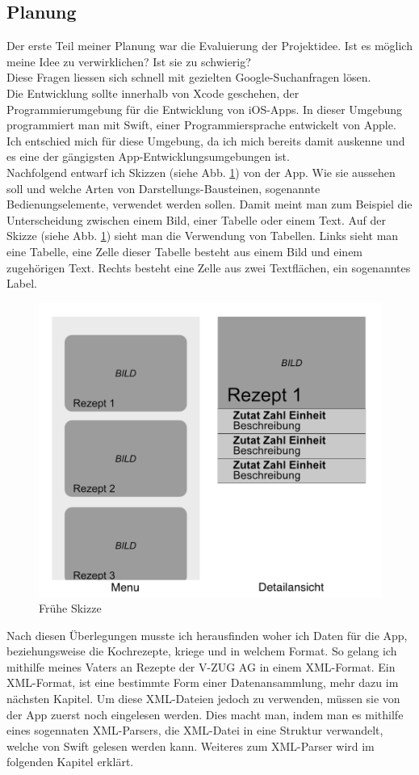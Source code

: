 \documentclass[12pt]{article}
\begin{document}
\subsection{Planung}
Der erste Teil meiner Planung war die Evaluierung der Projektidee. Ist es möglich meine Idee zu verwirklichen? Ist sie zu schwierig? \\ Diese Fragen liessen sich schnell mit gezielten Google-Suchanfragen lösen. \\ Die Entwicklung sollte innerhalb von Xcode geschehen, der Programmierumgebung für die Entwicklung von iOS-Apps. In dieser Umgebung programmiert man mit Swift, einer Programmiersprache entwickelt von Apple. Ich entschied mich für diese Umgebung, da ich mich bereits damit auskenne und es eine der gängigsten App-Entwicklungsumgebungen ist.\\ Nachfolgend entwarf ich Skizzen (siehe Abb. \ref{fig:earlySketch}) von der App. Wie sie aussehen soll und welche Arten von Darstellungs-Bausteinen, sogenannte Bedienungselemente, verwendet werden sollen. Damit meint man zum Beispiel die Unterscheidung zwischen einem Bild, einer Tabelle oder einem Text. Auf der Skizze (siehe Abb. \ref{fig:earlySketch}) sieht man die Verwendung von Tabellen. Links sieht man eine Tabelle, eine Zelle dieser Tabelle besteht aus einem Bild und einem zugehörigen Text. Rechts besteht eine Zelle aus zwei Textflächen, ein sogenanntes Label.
\begin{figure}
    \includegraphics[width=\linewidth]{pictures/Sketch.png}
    \caption{Frühe Skizze}
    \label{fig:earlySketch}
\end{figure}
Nach diesen Überlegungen musste ich herausfinden woher ich Daten für die App, beziehungsweise die Kochrezepte, kriege und in welchem Format. So gelang ich mithilfe meines Vaters an Rezepte der V-ZUG AG in einem XML-Format. Ein XML-Format, ist eine bestimmte Form einer Datenansammlung, mehr dazu im nächsten Kapitel. Um diese XML-Dateien jedoch zu verwenden, müssen sie von der App zuerst noch eingelesen werden. Dies macht man, indem man es mithilfe eines sogennaten XML-Parsers, die XML-Datei in eine Struktur verwandelt, welche von Swift gelesen werden kann. Weiteres zum XML-Parser wird im folgenden Kapitel erklärt. 
\end{document}
